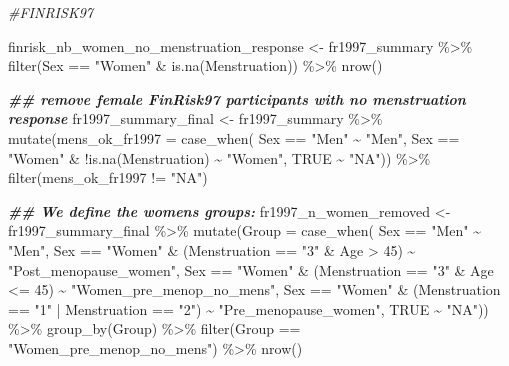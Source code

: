 \documentclass[
]{article}
\newenvironment{Shaded}{\begin{snugshade}}{\end{snugshade}}
\newcommand{\AttributeTok}[1]{\textcolor[rgb]{0.77,0.63,0.00}{#1}}
\newcommand{\CommentTok}[1]{\textcolor[rgb]{0.56,0.35,0.01}{\textit{#1}}}
\newcommand{\ConstantTok}[1]{\textcolor[rgb]{0.00,0.00,0.00}{#1}}
\newcommand{\DecValTok}[1]{\textcolor[rgb]{0.00,0.00,0.81}{#1}}
\newcommand{\DocumentationTok}[1]{\textcolor[rgb]{0.56,0.35,0.01}{\textbf{\textit{#1}}}}
\newcommand{\FunctionTok}[1]{\textcolor[rgb]{0.00,0.00,0.00}{#1}}
\newcommand{\NormalTok}[1]{#1}
\newcommand{\OtherTok}[1]{\textcolor[rgb]{0.56,0.35,0.01}{#1}}
\newcommand{\SpecialCharTok}[1]{\textcolor[rgb]{0.00,0.00,0.00}{#1}}
\newcommand{\StringTok}[1]{\textcolor[rgb]{0.31,0.60,0.02}{#1}}
\begin{document}
\begin{Shaded}
\begin{Highlighting}[]
\CommentTok{\#FINRISK97}

\NormalTok{finrisk\_nb\_women\_no\_menstruation\_response }\OtherTok{\textless{}{-}}\NormalTok{ fr1997\_summary }\SpecialCharTok{\%\textgreater{}\%} \FunctionTok{filter}\NormalTok{(Sex }\SpecialCharTok{==} \StringTok{"Women"} \SpecialCharTok{\&} \FunctionTok{is.na}\NormalTok{(Menstruation)) }\SpecialCharTok{\%\textgreater{}\%} \FunctionTok{nrow}\NormalTok{()}


\DocumentationTok{\#\# remove female FinRisk97 participants with no menstruation response}
\NormalTok{fr1997\_summary\_final }\OtherTok{\textless{}{-}}\NormalTok{ fr1997\_summary }\SpecialCharTok{\%\textgreater{}\%} 
  \FunctionTok{mutate}\NormalTok{(}\AttributeTok{mens\_ok\_fr1997 =} \FunctionTok{case\_when}\NormalTok{(}
\NormalTok{    Sex }\SpecialCharTok{==} \StringTok{"Men"} \SpecialCharTok{\textasciitilde{}} \StringTok{"Men"}\NormalTok{, }
\NormalTok{    Sex }\SpecialCharTok{==} \StringTok{"Women"} \SpecialCharTok{\&} \SpecialCharTok{!}\FunctionTok{is.na}\NormalTok{(Menstruation)  }\SpecialCharTok{\textasciitilde{}} \StringTok{"Women"}\NormalTok{,}
    \ConstantTok{TRUE} \SpecialCharTok{\textasciitilde{}} \StringTok{"NA"}\NormalTok{)) }\SpecialCharTok{\%\textgreater{}\%} 
  \FunctionTok{filter}\NormalTok{(mens\_ok\_fr1997 }\SpecialCharTok{!=} \StringTok{"NA"}\NormalTok{) }

\DocumentationTok{\#\# We define the women\textquotesingle{}s groups:}
\NormalTok{fr1997\_n\_women\_removed }\OtherTok{\textless{}{-}}\NormalTok{ fr1997\_summary\_final }\SpecialCharTok{\%\textgreater{}\%}
  \FunctionTok{mutate}\NormalTok{(}\AttributeTok{Group =} \FunctionTok{case\_when}\NormalTok{(}
\NormalTok{    Sex }\SpecialCharTok{==} \StringTok{"Men"} \SpecialCharTok{\textasciitilde{}} \StringTok{"Men"}\NormalTok{,}
\NormalTok{    Sex }\SpecialCharTok{==} \StringTok{"Women"} \SpecialCharTok{\&}\NormalTok{ (Menstruation }\SpecialCharTok{==} \StringTok{"3"} \SpecialCharTok{\&}\NormalTok{ Age }\SpecialCharTok{\textgreater{}} \DecValTok{45}\NormalTok{) }\SpecialCharTok{\textasciitilde{}} \StringTok{"Post\_menopause\_women"}\NormalTok{,}
\NormalTok{    Sex }\SpecialCharTok{==} \StringTok{"Women"} \SpecialCharTok{\&}\NormalTok{ (Menstruation }\SpecialCharTok{==} \StringTok{"3"} \SpecialCharTok{\&}\NormalTok{ Age }\SpecialCharTok{\textless{}=} \DecValTok{45}\NormalTok{) }\SpecialCharTok{\textasciitilde{}} \StringTok{"Women\_pre\_menop\_no\_mens"}\NormalTok{,}
\NormalTok{    Sex }\SpecialCharTok{==} \StringTok{"Women"} \SpecialCharTok{\&}\NormalTok{ (Menstruation }\SpecialCharTok{==} \StringTok{"1"} \SpecialCharTok{|}\NormalTok{ Menstruation }\SpecialCharTok{==} \StringTok{"2"}\NormalTok{) }\SpecialCharTok{\textasciitilde{}} \StringTok{"Pre\_menopause\_women"}\NormalTok{,}
    \ConstantTok{TRUE} \SpecialCharTok{\textasciitilde{}} \StringTok{"NA"}\NormalTok{)) }\SpecialCharTok{\%\textgreater{}\%}
  \FunctionTok{group\_by}\NormalTok{(Group) }\SpecialCharTok{\%\textgreater{}\%}
  \FunctionTok{filter}\NormalTok{(Group }\SpecialCharTok{==}  \StringTok{"Women\_pre\_menop\_no\_mens"}\NormalTok{) }\SpecialCharTok{\%\textgreater{}\%}
  \FunctionTok{nrow}\NormalTok{()}


\end{Highlighting}
\end{Shaded}
\end{document}
